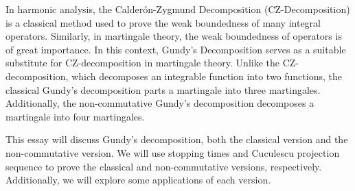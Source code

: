 \begin{abstracten}


In harmonic analysis, the Calderón-Zygmund Decomposition (CZ-Decomposition) is a classical method used to prove the weak boundedness of many integral operators. Similarly, in martingale theory, the weak boundedness of operators is of great importance. In this context, Gundy's Decomposition serves as a suitable substitute for CZ-decomposition in martingale theory. Unlike the CZ-decomposition, which decomposes an integrable function into two functions, the classical Gundy's decomposition parts a martingale into three martingales. Additionally, the non-commutative Gundy's decomposition decomposes a martingale into four martingales.

This essay will discuss Gundy's decomposition, both the classical version and the non-commutative version. We will use stopping times and Cuculescu projection sequence to prove the classical and non-commutative versions, respectively. Additionally, we will explore some applications of each version.
\end{abstracten}
